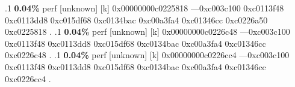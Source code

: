 \begin{profile}
{.1 \textbf{ 0.04\%} perf             [unknown]              [k] 0x00000000c0225818\newline {} ---0xc003c100\newline {} 0xc0113f48\newline {} 0xc0113dd8\newline {} 0xc015df68\newline {} 0xc0134bac\newline {} 0xc00a3fa4\newline {} 0xc01346cc\newline {} 0xc0226a50\newline {} 0xc0225818\newline {} . 
.1 \textbf{ 0.04\%} perf             [unknown]              [k] 0x00000000c0226c48\newline {} ---0xc003c100\newline {} 0xc0113f48\newline {} 0xc0113dd8\newline {} 0xc015df68\newline {} 0xc0134bac\newline {} 0xc00a3fa4\newline {} 0xc01346cc\newline {} 0xc0226c48\newline {} . 
.1 \textbf{ 0.04\%} perf             [unknown]              [k] 0x00000000c0226cc4\newline {} ---0xc003c100\newline {} 0xc0113f48\newline {} 0xc0113dd8\newline {} 0xc015df68\newline {} 0xc0134bac\newline {} 0xc00a3fa4\newline {} 0xc01346cc\newline {} 0xc0226cc4\newline {} . 
}
\end{profile}
